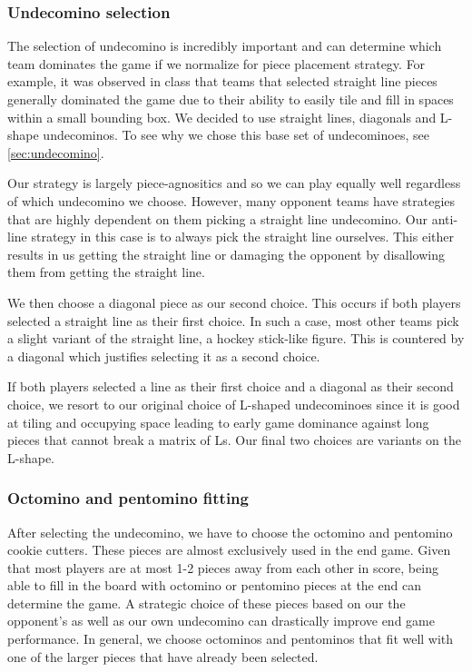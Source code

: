 \documentclass{scrartcl}
\begin{document}
\subsubsection{Undecomino selection} %
The selection of undecomino is incredibly important and can determine which team dominates the game if we normalize for piece placement strategy. For example, it was observed in class that teams that selected straight line pieces generally dominated the game due to their ability to easily tile and fill in spaces within a small bounding box. We decided to use straight lines, diagonals and L-shape undecominos. To see why we chose this base set of undecominoes, see \ref{sec:undecomino}.

Our strategy is largely piece-agnositics and so we can play equally well regardless of which undecomino we choose. However, many opponent teams have strategies that are highly dependent on them picking a straight line undecomino. Our anti-line strategy in this case is to always pick the straight line ourselves. This either results in us getting the straight line or damaging the opponent by disallowing them from getting the straight line.

We then choose a diagonal piece as our second choice. This occurs if both players selected a straight line as their first choice. In such a case, most other teams pick a slight variant of the straight line, a hockey stick-like figure. This is countered by a diagonal which justifies selecting it as a second choice.

If both players selected a line as their first choice and a diagonal as their second choice, we resort to our original choice of L-shaped undecominoes since it is good at tiling and occupying space leading to early game dominance against long pieces that cannot break a matrix of Ls. Our final two choices are variants on the L-shape.

\subsubsection{Octomino and pentomino fitting} %
After selecting the undecomino, we have to choose the octomino and pentomino cookie cutters. These pieces are almost exclusively used in the end game. Given that most players are at most 1-2 pieces away from each other in score, being able to fill in the board with octomino or pentomino pieces at the end can determine the game. A strategic choice of these pieces based on our the opponent's as well as our own undecomino can drastically improve end game performance. In general, we choose octominos and pentominos that fit well with one of the larger pieces that have already been selected.
\end{document}
